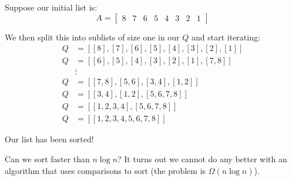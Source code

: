 \begin{example}
    Suppose our initial list is:
    \[ A = \begin{bmatrix}
        8 & 7 & 6 & 5 & 4 & 3 & 2 & 1
    \end{bmatrix} \]

    We then split this into sublists of size one in our $Q$ and start iterating:
    \begin{align*}
        Q &= [
            [8], [7], [6], [5], [4], [3], [2], [1]
        ] \\
        Q &= [
            [6], [5], [4], [3], [2], [1], [7, 8]
        ] \\
        &\vdots \\
        Q &= [
            [7, 8] , [5, 6] , [3, 4] , [1, 2]
        ] \\
        Q &= [[3, 4] , [1, 2] , [5, 6, 7, 8]] \\
        Q &= [[1, 2, 3, 4] , [5, 6, 7, 8]] \\
        Q &= [[1, 2, 3, 4, 5, 6, 7, 8]] 
    \end{align*}

    Our list has been sorted!
\end{example}

Can we sort faster than $n \log n$? It turns out we cannot do any better with an algorithm that uses comparisons to
sort (the problem is $\Omega(n \log n)$).

